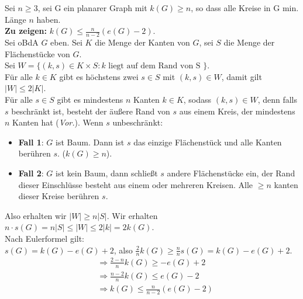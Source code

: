 \begin{problem}[1a]
  Sei \( n \geq 3 \), sei G ein planarer Graph mit \( k(G) \geq n \), so dass alle Kreise in G min. Länge \( n \) haben. \\
  \textbf{Zu zeigen:} \( k(G) \leq \frac{n}{n-2}(e(G) - 2) \). \\
  Sei oBdA \( G \) eben. Sei \( K \) die Menge der Kanten von \( G \), sei \( S \) die Menge der Flächenstücke von \( G \). \\
  Sei \( W = \{ (k,s) \in K \times S : k \text{ liegt auf dem Rand von S } \} \). \\
  Für alle \( k \in K \) gibt es höchstens zwei \( s \in S \) mit \( (k,s) \in W \), damit gilt \( \vert W \vert \leq 2 \vert K \vert \). \\
  Für alle \( s \in S \) gibt es mindestens \( n \) Kanten \( k \in K \), sodass \( (k,s) \in W \), denn falls \( s \) beschränkt ist, besteht der äußere Rand von \( s \) aus einem Kreis, der mindestens \( n \) Kanten hat (\emph{Vor.}). Wenn \( s \) unbeschränkt:
  \begin{itemize}
    \item \textbf{Fall 1}: \( G \) ist Baum. Dann ist \( s \) das einzige Flächenstück und alle Kanten berühren \( s \). (\( k(G) \geq n \)).
    \item \textbf{Fall 2}: \( G \) ist kein Baum, dann schließt \( s \) andere Flächenstücke ein, der Rand dieser Einschlüsse besteht aus einem oder mehreren Kreisen. Alle \( \geq n \) kanten dieser Kreise berühren \( s \).
  \end{itemize} 
  Also erhalten wir \( \vert W \vert \geq n \vert S \vert \). Wir erhalten \( n \cdot s(G) = n\vert S \vert \leq \vert W \vert \leq 2 \vert k \vert = 2k(G) \). \\
  Nach Eulerformel gilt: \\
  \( s(G) = k(G) - e(G) + 2 \), also \( \frac{2}{n}k(G) \geq \frac{n}{n} s(G) = k(G) - e(G) + 2 \).
  \begin{align*}
    &\Rightarrow \frac{2-n}{n}k(G) \geq - e(G) + 2 \\
    &\Rightarrow \frac{n-2}{n}k(G) \leq e(G) - 2 \\
    &\Rightarrow k(G) \leq \frac{n}{n-2}(e(G) - 2)
  \end{align*}
\end{problem}

